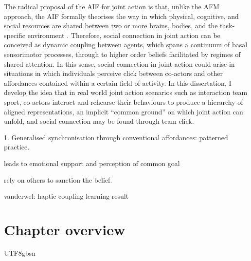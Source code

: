 \begin{CJK}{UTF8}{gbsn}

The radical proposal of the AIF for joint action is that, unlike the AFM approach, the AIF formally theorises the way in which physical, cognitive, and social resources are shared between two or more brains, bodies, and the task-specific environment \citep{Clark2015}.  Therefore, social connection in joint action can be conceived as dynamic coupling between agents, which spans a continuum of basal sensorimotor processes, through to higher order beliefs facilitated by regimes of shared attention.  In this sense, social connection in joint action could arise in situations in which individuals perceive click between co-actors and other affordances contained within a certain field of activity.  In this dissertation, I develop the idea that in real world joint action scenarios such as interaction team sport, co-actors interact and rehearse their behaviours to produce a hierarchy of aligned representations, an implicit ``common ground'' \citep[cf.][]{Noy2017} on which joint action can unfold, and social connection may be found through team click.


1. Generalised synchronisation through conventional affordances:
patterned practice.

leads to emotional support and perception of common goal

rely on others to sanction the belief.

vanderwel: haptic coupling learning result











































\section{Chapter overview}


                                              \end{CJK}{UTF8}{gbsn}
